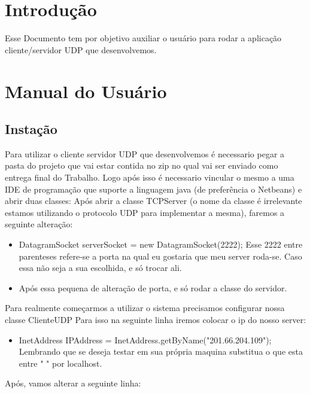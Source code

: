 \documentclass{abnt}
\begin{document}






\capa

\folhaderosto

\tableofcontents


\chapter{Introdução}
Esse Documento tem por objetivo auxiliar o usuário para rodar a aplicação cliente/servidor UDP que desenvolvemos.

\clearpage
\chapter{Manual do Usuário}

	\section{Instação}	
	Para utilizar o cliente servidor UDP que desenvolvemos é necessario pegar a pasta do projeto que vai estar contida no zip no qual vai ser enviado como entrega final do Trabalho. Logo após isso é necessario vincular o mesmo a uma IDE de programação que suporte a linguagem java (de preferência o Netbeans) e abrir duas classes:
	Após abrir a classe TCPServer (o nome da classe é irrelevante estamos utilizando o protocolo UDP para implementar a mesma), faremos a seguinte alteração:
		\begin{itemize}
			\item DatagramSocket serverSocket = new DatagramSocket(2222); Esse 2222 entre parenteses refere-se a porta na qual eu gostaria que meu server roda-se. Caso essa não seja a sua escolhida, e só trocar ali.
			\item Após essa pequena de alteração de porta, e só rodar a classe do servidor.
		\end{itemize}	
	Para realmente começarmos a utilizar o sistema precisamos configurar nossa classe ClienteUDP	
		Para isso na seguinte linha iremos colocar o ip do nosso server:
		\begin{itemize}
		\item InetAddress IPAddress = InetAddress.getByName("201.66.204.109"); Lembrando que se deseja testar em sua própria maquina substitua o que esta entre " " por localhost.
		\end{itemize}	
		Após, vamos alterar a seguinte linha: 
		
\end{document}
